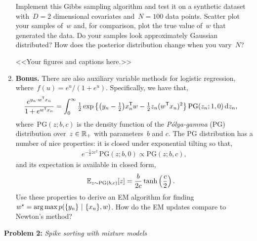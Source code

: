 \documentclass[11pt]{article}
\begin{document}
\begin{enumerate}[label=(\alph*)]
    Implement this Gibbs sampling algorithm and test it on a synthetic dataset with~$D=2$ dimensional covariates and~$N=100$ data points.  Scatter plot your samples of~$w$ and, for comparison, plot the true value of~$w$ that generated the data. Do your samples look approximately Gaussian distributed?  How does the posterior distribution change when you vary~$N$? 
    
    \begin{solution}
    <<Your figures and captions here.>>
    \end{solution}
    
    \item \textbf{Bonus.}  There are also auxiliary variable methods for logistic regression, where~$f(u) = e^u / (1+e^u)$.  Specifically,  we have that,
    \begin{align*}
        \frac{e^{y_n \cdot w^{\mathsf{T}} x_n}}{1 + e^{w^{\mathsf{T}} x_n}} &= 
        \int_0^\infty \tfrac{1}{2} \exp \left\{ \big(y_n - \tfrac{1}{2}\big) x_n^{\mathsf{T}} w -\tfrac{1}{2} z_n (w^{\mathsf{T}} x_n)^2 \right\} \mathrm{PG}(z_n; 1, 0) \, \mathrm{d}z_n,
    \end{align*}
    where~$\mathrm{PG}(z; b, c)$ is the density function of the \emph{P\'{o}lya-gamma} (PG) distribution over~$z \in \mathbb{R}_+$ with parameters~$b$ and $c$.   The PG distribution has a number of nice properties: it is closed under exponential tilting so that,
    \begin{align*}
        e^{-\tfrac{1}{2} z c^2} \, \mathrm{PG}(z; b, 0) \propto \mathrm{PG}(z; b, c),
    \end{align*}
    and its expectation is available in closed form,
    \begin{align*}
        \mathbb{E}_{z \sim \mathrm{PG}(b, c)}[z] &= \frac{b}{2c} \tanh \left(\frac{c}{2} \right).
    \end{align*}
    Use these properties to derive an EM algorithm for finding~$w^\star = \operatorname*{arg\,max} p(\{y_n\} ~\vert~ \{x_n\}, w)$.  How do the EM updates compare to Newton's method?
    
\end{enumerate}

\clearpage


\textbf{Problem 2:} \textit{Spike sorting with mixture models} 
\end{document}
